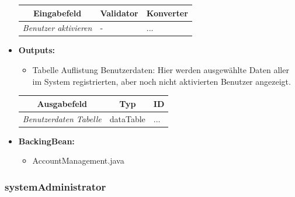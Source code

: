 \begin{itemize}
				\begin{center}
					\begin{longtable}{|p{3cm} |p{8cm} | p{5cm}|}
						
						\hline \multicolumn{1}{|c|}{\textbf{Eingabefeld}} & \multicolumn{1}{|c|}{\textbf{Validator}} & \multicolumn{1}{|c|}{\textbf{Konverter}} \\ \hline
						\endfirsthead
						\hline
						\endlastfoot
						\textit{Benutzer aktivieren} & - & ... \\ \hline
					\end{longtable}
				\end{center}
				
			\item \textbf{Outputs:}
				\begin{itemize}
					\item Tabelle Auflistung Benutzerdaten: Hier werden ausgewählte Daten aller im System registrierten, aber noch nicht aktivierten Benutzer angezeigt.
				\end{itemize}
				
					\begin{center}
						\begin{longtable}{|p{5cm} | p{4cm}|p{3cm}|}
							
							\hline \multicolumn{1}{|c|}{\textbf{Ausgabefeld}} & \multicolumn{1}{|c|}{\textbf{Typ}}  &  \multicolumn{1}{|c|}{\textbf{ID}} \\ \hline
							\endfirsthead
							\hline
							\endlastfoot
							\textit{Benutzerdaten Tabelle}  & dataTable & ... \\ \hline
						\end{longtable}
					\end{center}
				
			\item \textbf{BackingBean:}
				\begin{itemize}
					\item AccountManagement.java
				\end{itemize}
		\end{itemize}
		
		\subsubsection{systemAdministrator}
		
